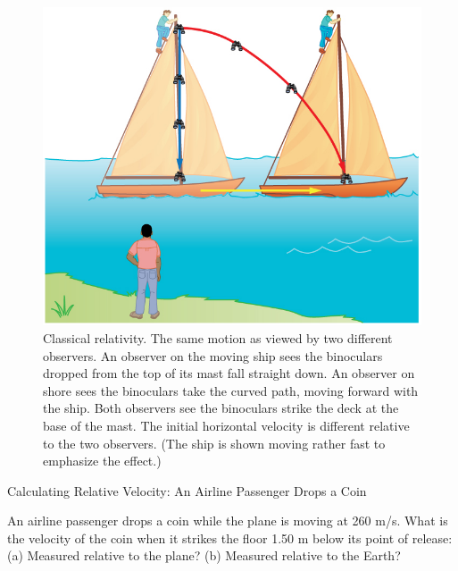 \documentclass[
]{book}
\begin{document}
\begin{figure}
\hypertarget{import-auto-id1892076}{%
\centering
\includegraphics{images/Figure_03_05_05.jpg}
\caption{Classical relativity. The same motion as viewed by two different
observers. An observer on the moving ship sees the binoculars dropped
from the top of its mast fall straight down. An observer on shore sees
the binoculars take the curved path, moving forward with the ship. Both
observers see the binoculars strike the deck at the base of the mast.
The initial horizontal velocity is different relative to the two
observers. (The ship is shown moving rather fast to emphasize the
effect.)}\label{import-auto-id1892076}
}
\end{figure}

\hypertarget{fs-id1890300}{}
Calculating Relative Velocity: An Airline Passenger Drops a Coin

An airline passenger drops a coin while the plane is moving at 260 m/s.
What is the velocity of the coin when it strikes the floor 1.50 m below
its point of release: (a) Measured relative to the plane? (b) Measured
relative to the Earth?
\end{document}
